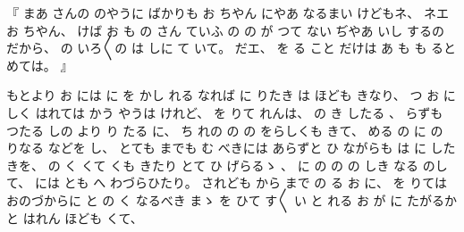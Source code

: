
%
『
まあ
さんの
のやうに
ばかりも
お
ちやん
にやあ
なるまい
けどもネ、
%
ネエ
お
ちやん、
%
けば
お
も
の
さん
ていふ
の
の
が
つて
ない
ぢやあ
いし
するの
だから、
%
の
いろ〳〵の
は
しに
て
いて。
%
だエ、
%
を
る
こと
だけは
あ
も
も
ると
めては。
』

%
もとより
お
には
に
を
かし
れる
なれば
に
りたき
は
ほども
きなり、
%
つ
お
に
しく
はれては
%
かう
やうは
けれど、
%
を
りて
れんは、
%
の
き
したる
、
%
らずも
つたる
しの
より
り
たる
に、
%
ち
れの
の
の
をらしくも
きて、
%
める
の
に
の
りなる
などを
し、
%
とても
までも
む
べきには
あらずと
ひ
ながらも
は
に
したきを、
%
の
く
くて
くも
きたり
とて
ひ
げらるゝ
、
%
に
の
の
の
しき
なる
のして、
%
には
とも
へ
%
わづらひたり。
%
されども
から
まで
の
る
お
に、
%
を
りては
おのづからに
と
の
く
なるべき
まゝ
を
ひて
す〳〵
い
と
れる
お
が
に
たがるかと
はれん
ほども
くて、


